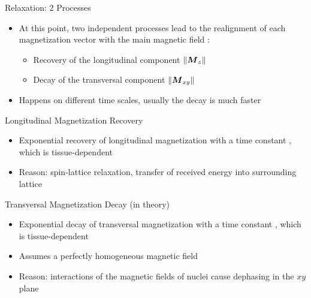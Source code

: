 \begin{frame}{Relaxation: 2 Processes}

    \begin{itemize}
        \item At this point, two independent processes lead to the realignment of each magnetization vector \magn{} with the main magnetic field :
              \begin{itemize}
                  \item Recovery of the longitudinal component $\Vert \boldsymbol{M}_z{} \Vert$
                  \item Decay of the transversal component $\Vert \boldsymbol{M}_{xy}{} \Vert$
              \end{itemize}
        \item Happens on different time scales, usually the decay is much faster
    \end{itemize}
\end{frame}

\begin{frame}{Longitudinal Magnetization Recovery}

    \begin{center}
        
    \end{center}

    \begin{itemize}
        \item Exponential recovery of longitudinal magnetization with a time constant \longtime{}, which is tissue-dependent
        \item Reason: spin-lattice relaxation, transfer of received energy into surrounding lattice
    \end{itemize}
\end{frame}

\begin{frame}{Transversal Magnetization Decay (in theory)}

    \begin{center}
        
    \end{center}

    \begin{itemize}
        \item Exponential decay of transversal magnetization with a time constant \transtime{}, which is tissue-dependent
        \item Assumes a perfectly homogeneous magnetic field
        \item Reason: interactions of the magnetic fields of nuclei cause dephasing in the $xy$ plane
    \end{itemize}
\end{frame}

